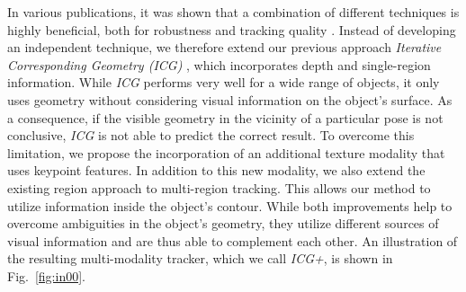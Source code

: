 \documentclass[letterpaper, 10 pt, conference]{ieeeconf}
\begin{document}
In various publications, it was shown that a combination of different techniques is highly beneficial, both for robustness and tracking quality \cite{Brox2010, Krainin2011, Zhong2019}.
Instead of developing an independent technique, we therefore extend our previous approach \textit{Iterative Corresponding Geometry (ICG)} \cite{Stoiber2022}, which incorporates depth and single-region information.
While \textit{ICG} performs very well for a wide range of objects, it only uses geometry without considering visual information on the object's surface.
As a consequence, if the visible geometry in the vicinity of a particular pose is not conclusive, \textit{ICG} is not able to predict the correct result.
To overcome this limitation, we propose the incorporation of an additional texture modality that uses keypoint features.
In addition to this new modality, we also extend the existing region approach to multi-region tracking.
This allows our method to utilize information inside the object's contour.
While both improvements help to overcome ambiguities in the object's geometry, they utilize different sources of visual information and are thus able to complement each other.
An illustration of the resulting multi-modality tracker, which we call \textit{ICG+}, is shown in Fig.~\ref{fig:in00}.
\end{document}

